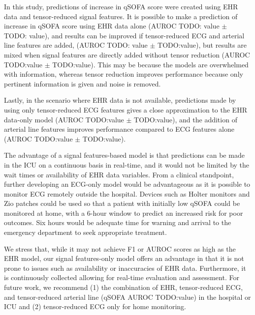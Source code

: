 
In this study, predictions of increase in qSOFA score were created using EHR data and tensor-reduced signal features. It is possible to make a prediction of increase in qSOFA score using EHR data alone (AUROC TODO: value $\pm$ TODO: value), and results can be improved if tensor-reduced ECG and arterial line features are added, (AUROC TODO: value $\pm$ TODO:value), but results are mixed when signal features are directly added without tensor reduction (AUROC TODO:value $\pm$ TODO:value). This may be because the models are overwhelmed with information, whereas tensor reduction improves performance because only pertinent information is given and noise is removed.

Lastly, in the scenario where EHR data is not available, predictions made by using only tensor-reduced ECG features gives a close approximation to the EHR data-only model (AUROC TODO:value $\pm$ TODO:value), and the addition of arterial line features improves performance compared to ECG features alone (AUROC TODO:value $\pm$ TODO:value). 

The advantage of a signal features-based model is that predictions can be made in the ICU on a continuous basis in real-time, and it would not be limited by the wait times or availability of EHR data variables. From a clinical standpoint, further developing an ECG-only model would be advantageous as it is possible to monitor ECG remotely outside the hospital. Devices such as Holter monitors and Zio patches could be used so that a patient with initially low qSOFA could be monitored at home, with a 6-hour window to predict an increased risk for poor outcomes. Six hours would be adequate time for warning and arrival to the emergency department to seek appropriate treatment.

We stress that, while it may not achieve F1 or AUROC scores as high as the EHR model, our signal features-only model offers an advantage in that it is not prone to issues such as availability or inaccuracies of EHR data. Furthermore, it is continuously collected allowing for real-time evaluation and assessment. For future work, we recommend (1) the combination of EHR, tensor-reduced ECG, and tensor-reduced arterial line (qSOFA AUROC TODO:value) in the hospital or ICU and (2) tensor-reduced  ECG only for home monitoring.